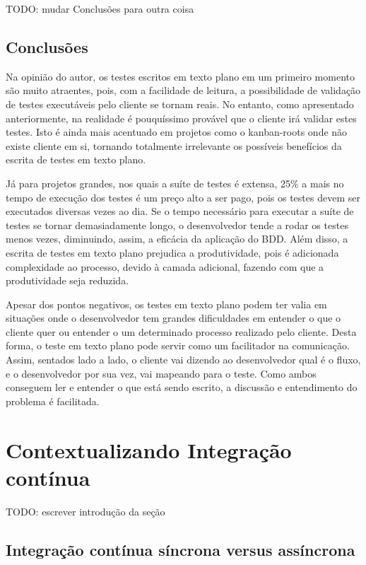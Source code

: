 TODO: mudar Conclusões para outra coisa

\subsection{Conclusões}
\label{sub:conclusoes_bdd}

Na opinião do autor, os testes escritos em texto plano em um primeiro momento são muito atraentes, pois, com a facilidade de leitura, a possibilidade de validação de testes executáveis pelo cliente se tornam reais. No entanto, como apresentado anteriormente, na realidade é pouquíssimo provável que o cliente irá validar estes testes. Isto é ainda mais acentuado em projetos como o kanban-roots onde não existe cliente em si, tornando totalmente irrelevante os possíveis benefícios da escrita de testes em texto plano.

Já para projetos grandes, nos quais a suíte de testes é extensa, 25\% a mais no tempo de execução dos testes é um preço alto a ser pago, pois os testes devem ser executados diversas vezes ao dia. Se o tempo necessário para executar a suíte de testes se tornar demasiadamente longo, o desenvolvedor tende a rodar os testes menos vezes, diminuindo, assim, a eficácia da aplicação do BDD. Além disso, a escrita de testes em texto plano prejudica a produtividade, pois é adicionada complexidade ao processo, devido à camada adicional, fazendo com que a produtividade seja reduzida.

Apesar dos pontos negativos, os testes em texto plano podem ter valia em situações onde o desenvolvedor tem grandes dificuldades em entender o que o cliente quer ou entender o um determinado processo realizado pelo cliente. Desta forma, o teste em texto plano pode servir como um facilitador na comunicação. Assim, sentados lado a lado, o cliente vai dizendo ao desenvolvedor qual é o fluxo, e o desenvolvedor por sua vez, vai mapeando para o teste. Como ambos conseguem ler e entender o que está sendo escrito, a discussão e entendimento do problema é facilitada.


\section{Contextualizando Integração contínua}

TODO: escrever introdução da seção

\subsection{Integração contínua síncrona versus assíncrona}
\label{sub:sincrona_x_assincrona}

